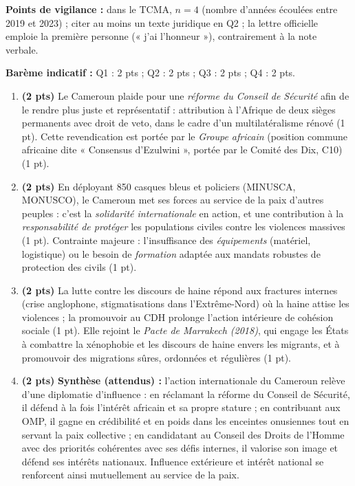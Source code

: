 \documentclass[11pt]{article}
\begin{document}
\begin{corrige}
\begin{enumerate}
\end{enumerate}
\textbf{Points de vigilance :} dans le TCMA, $n = 4$ (nombre d'années écoulées entre 2019 et 2023) ; citer au moins un texte juridique en Q2 ; la lettre officielle emploie la première personne (« j'ai l'honneur »), contrairement à la note verbale.
\end{corrige}

\begin{corrige}
\textbf{Barème indicatif :} Q1 : 2 pts ; Q2 : 2 pts ; Q3 : 2 pts ; Q4 : 2 pts.

\begin{enumerate}
    \item \textbf{(2 pts)} Le Cameroun plaide pour une \emph{réforme du Conseil de Sécurité} afin de le rendre plus juste et représentatif : attribution à l'Afrique de deux sièges permanents avec droit de veto, dans le cadre d'un multilatéralisme rénové (1 pt). Cette revendication est portée par le \emph{Groupe africain} (position commune africaine dite « Consensus d'Ezulwini », portée par le Comité des Dix, C10) (1 pt).
    \item \textbf{(2 pts)} En déployant 850 casques bleus et policiers (MINUSCA, MONUSCO), le Cameroun met ses forces au service de la paix d'autres peuples : c'est la \emph{solidarité internationale} en action, et une contribution à la \emph{responsabilité de protéger} les populations civiles contre les violences massives (1 pt). Contrainte majeure : l'insuffisance des \emph{équipements} (matériel, logistique) ou le besoin de \emph{formation} adaptée aux mandats robustes de protection des civils (1 pt).
    \item \textbf{(2 pts)} La lutte contre les discours de haine répond aux fractures internes (crise anglophone, stigmatisations dans l'Extrême-Nord) où la haine attise les violences ; la promouvoir au CDH prolonge l'action intérieure de cohésion sociale (1 pt). Elle rejoint le \emph{Pacte de Marrakech (2018)}, qui engage les États à combattre la xénophobie et les discours de haine envers les migrants, et à promouvoir des migrations sûres, ordonnées et régulières (1 pt).
    \item \textbf{(2 pts)} \textbf{Synthèse (attendus) :} l'action internationale du Cameroun relève d'une diplomatie d'influence : en réclamant la réforme du Conseil de Sécurité, il défend à la fois l'intérêt africain et sa propre stature ; en contribuant aux OMP, il gagne en crédibilité et en poids dans les enceintes onusiennes tout en servant la paix collective ; en candidatant au Conseil des Droits de l'Homme avec des priorités cohérentes avec ses défis internes, il valorise son image et défend ses intérêts nationaux. Influence extérieure et intérêt national se renforcent ainsi mutuellement au service de la paix.

\end{enumerate}
\end{corrige}
\end{document}
